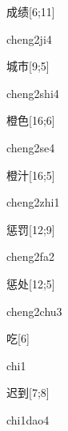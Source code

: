 \begin{verbete}[cheng2ji4]{成绩}[6;11]
\begin{pronuncia}{cheng2ji4}
\end{pronuncia}
\end{verbete}

\begin{verbete}{城市}[9;5]
\begin{pronuncia}{cheng2shi4}
\end{pronuncia}
\end{verbete}

\begin{verbete}[cheng2se4]{橙色}[16;6]
\begin{pronuncia}{cheng2se4}
\end{pronuncia}
\end{verbete}

\begin{verbete}{橙汁}[16;5]
\begin{pronuncia}{cheng2zhi1}
\end{pronuncia}
\end{verbete}

\begin{verbete}[cheng2fa2]{惩罚}[12;9]
\begin{pronuncia}{cheng2fa2}
\end{pronuncia}
\end{verbete}

\begin{verbete}{惩处}[12;5]
\begin{pronuncia}{cheng2chu3}
\end{pronuncia}
\end{verbete}

\begin{verbete}[chi1]{吃}[6]
\begin{pronuncia}{chi1}
\end{pronuncia}
\end{verbete}

\begin{verbete}{迟到}[7;8]
\begin{pronuncia}{chi1dao4}
\end{pronuncia}
\end{verbete}

